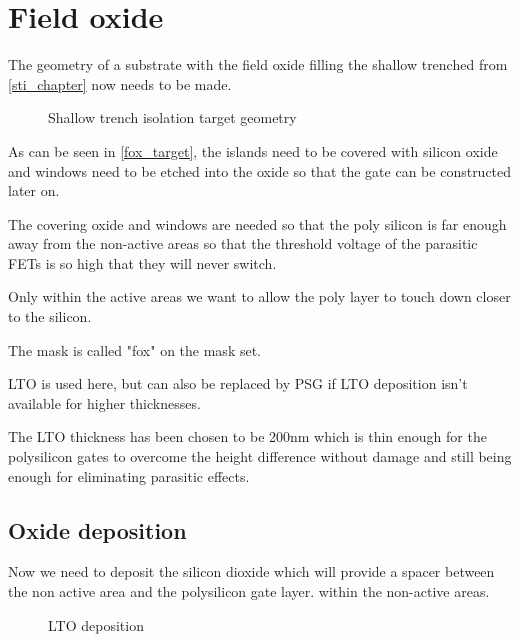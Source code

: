 \section{Field oxide}\label{fox_chapter}

The geometry of a substrate with the field oxide filling the shallow trenched from \autoref{sti_chapter} now needs to be made.

\begin{figure}[H]
	\centering
	\begin{tikzpicture}[node distance = 3cm, auto, thick,scale=\CrossAndTopSectionBig, every node/.style={transform shape}]
		
	\end{tikzpicture}
	\caption{Shallow trench isolation target geometry}
	\label{fox_target}
\end{figure}

As can be seen in \autoref{fox_target}, the islands need to be covered with silicon oxide and windows need to be etched into the oxide so that the gate can be constructed later on.

The covering oxide and windows are needed so that the poly silicon is far enough away from the non-active areas so that the threshold voltage of the parasitic FETs is so high that they will never switch.

Only within the active areas we want to allow the poly layer to touch down closer to the silicon.

The mask is called "fox" on the mask set.

LTO is used here, but can also be replaced by PSG if LTO deposition isn't available for higher thicknesses.

The LTO thickness has been chosen to be 200nm which is thin enough for the polysilicon gates to overcome the height difference without damage and still being enough for eliminating parasitic effects.

\newpage

\subsection{Oxide deposition}

Now we need to deposit the silicon dioxide which will provide a spacer between the non active area and the polysilicon gate layer. within the non-active areas.

\begin{figure}[H]
	\centering
	\begin{tikzpicture}[node distance = 3cm, auto, thick,scale=\CrossSectionOnly, every node/.style={transform shape}]
		
	\end{tikzpicture}
	\drawStepArrow{}
	\begin{tikzpicture}[node distance = 3cm, auto, thick,scale=\CrossSectionOnly, every node/.style={transform shape}]
		
	\end{tikzpicture}
	\caption{LTO deposition}
\end{figure}


